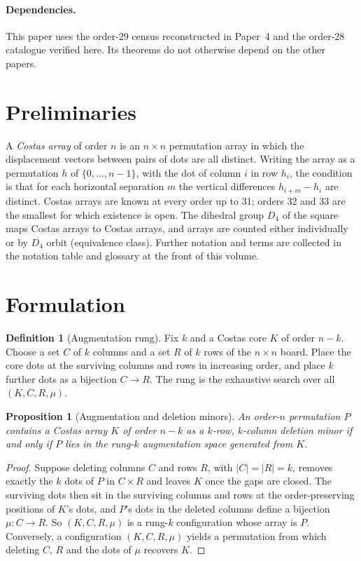 \documentclass[11pt,a4paper,oneside]{report}
\newtheorem{proposition}[theorem]{Proposition}
\theoremstyle{definition}
\newtheorem{definition}[theorem]{Definition}
\begin{document}
\paragraph{Dependencies.} This paper uses the order-29 census reconstructed in Paper~4 and the order-28 catalogue verified here. Its theorems do not otherwise depend on the other papers.

\section{Preliminaries}\label{p3-sec:notation}
A \emph{Costas array} of order $n$ is an $n\times n$ permutation array in which the displacement
vectors between pairs of dots are all distinct. Writing the array as a permutation $h$ of
$\{0,\dots,n-1\}$, with the dot of column $i$ in row $h_i$, the condition is that for each
horizontal separation $m$ the vertical differences $h_{i+m}-h_i$ are distinct. Costas arrays are
known at every order up to 31; orders 32 and 33 are the smallest for which existence is open. The
dihedral group $D_4$ of the square maps Costas arrays to Costas arrays, and arrays are counted
either individually or by $D_4$ orbit (equivalence class). Further notation and terms are collected
in the notation table and glossary at the front of this volume.

\section{Formulation}

\begin{definition}[Augmentation rung]
Fix $k$ and a Costas core $K$ of order $n-k$. Choose a set $C$ of $k$ columns
and a set $R$ of $k$ rows of the $n\times n$ board. Place the core dots at the
surviving columns and rows in increasing order, and place $k$ further dots as a
bijection $C\to R$. The rung is the exhaustive search over all
$(K,C,R,\mu)$.
\end{definition}

\begin{proposition}[Augmentation and deletion minors]
\label{p3-prop:augminor}
An order-$n$ permutation $P$ contains a Costas array $K$ of order $n-k$ as a $k$-row, $k$-column
deletion minor if and only if $P$ lies in the rung-$k$ augmentation space generated from $K$.
\end{proposition}
\begin{proof}
Suppose deleting columns $C$ and rows $R$, with $|C|=|R|=k$, removes exactly the $k$ dots of $P$
in $C\times R$ and leaves $K$ once the gaps are closed. The surviving dots then sit in the surviving
columns and rows at the order-preserving positions of $K$'s dots, and $P$'s dots in the deleted
columns define a bijection $\mu:C\to R$. So $(K,C,R,\mu)$ is a rung-$k$ configuration whose array
is $P$. Conversely, a configuration $(K,C,R,\mu)$ yields a permutation from which deleting $C$, $R$
and the dots of $\mu$ recovers $K$.
\end{proof}
\end{document}
